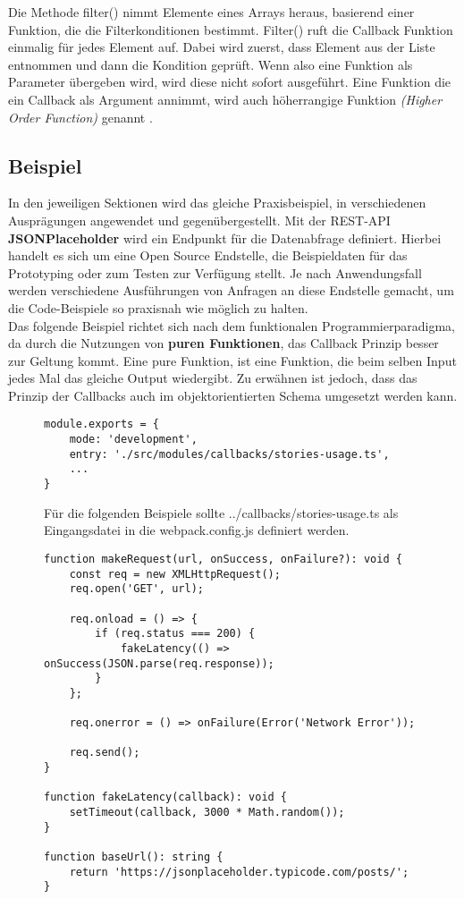 \noindent
Die Methode filter() nimmt Elemente eines Arrays heraus, basierend einer Funktion, die die Filterkonditionen bestimmt. Filter() ruft die Callback Funktion einmalig für jedes Element auf. Dabei wird zuerst, dass Element aus der Liste entnommen und dann die Kondition geprüft. Wenn also eine Funktion als Parameter übergeben wird, wird diese nicht sofort ausgeführt. Eine Funktion die ein Callback als Argument annimmt, wird auch höherrangige Funktion \textit{(Higher Order Function)} genannt \cite{callbacks-example}.

\subsection{Beispiel}
In den jeweiligen Sektionen wird das gleiche Praxisbeispiel, in verschiedenen Ausprägungen angewendet und gegenübergestellt. Mit der REST-API \textbf{JSONPlaceholder} wird ein Endpunkt für die Datenabfrage definiert. Hierbei handelt es sich um eine Open Source Endstelle, die Beispieldaten für das Prototyping oder zum Testen zur Verfügung stellt. Je nach Anwendungsfall werden verschiedene Ausführungen von Anfragen an diese Endstelle gemacht, um die Code-Beispiele so praxisnah wie möglich zu halten.\\

\noindent
Das folgende Beispiel richtet sich nach dem funktionalen Programmierparadigma, da durch die Nutzungen von \textbf{puren Funktionen}, das Callback Prinzip besser zur Geltung kommt. Eine pure Funktion, ist eine Funktion, die beim selben Input jedes Mal das gleiche Output wiedergibt. Zu erwähnen ist jedoch, dass das Prinzip der Callbacks auch im objektorientierten Schema umgesetzt werden kann. 

\begin{figure}[H]
\begin{lstlisting}[basicstyle=\small]
module.exports = {
    mode: 'development',
    entry: './src/modules/callbacks/stories-usage.ts',
    ...
}
\end{lstlisting}
\caption{Für die folgenden Beispiele sollte ../callbacks/stories-usage.ts als Eingangsdatei in die webpack.config.js definiert werden.}
\end{figure}

\begin{figure}[H]
\begin{lstlisting}[basicstyle=\small]
function makeRequest(url, onSuccess, onFailure?): void {
    const req = new XMLHttpRequest();
    req.open('GET', url);

    req.onload = () => {
        if (req.status === 200) {
            fakeLatency(() => onSuccess(JSON.parse(req.response));
        }
    };

    req.onerror = () => onFailure(Error('Network Error'));

    req.send();
}

function fakeLatency(callback): void {
    setTimeout(callback, 3000 * Math.random());
}

function baseUrl(): string {
    return 'https://jsonplaceholder.typicode.com/posts/';
}
\end{lstlisting}
\end{figure}

